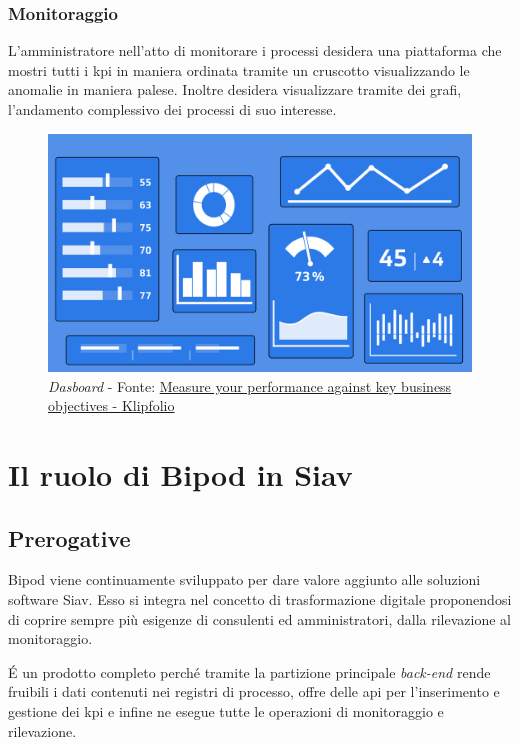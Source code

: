 \subsubsection{Monitoraggio}
L'amministratore nell'atto di monitorare i processi desidera una piattaforma che mostri tutti i \acrshort{kpi} in maniera ordinata tramite un cruscotto visualizzando le anomalie in maniera palese.  Inoltre desidera visualizzare tramite dei grafi, l'andamento complessivo dei processi di suo interesse.
\begin{figure}[H]
    \centering
    \includegraphics[width=0.80\columnwidth]{immagini/dashboard.png}
    \caption{\textit{Dasboard} - Fonte: \href{https://www.klipfolio.com/resources/articles/what-is-a-key-performance-indicator}{Measure your performance against key business objectives - Klipfolio}}
    \label{fig:my_label}
\end{figure}

\section{Il ruolo di Bipod in Siav}
\subsection{Prerogative}
Bipod viene continuamente sviluppato per dare valore aggiunto alle soluzioni software Siav. Esso si integra nel concetto di trasformazione digitale proponendosi di coprire sempre più esigenze di consulenti ed amministratori, dalla rilevazione al monitoraggio.

\'E un prodotto completo perché tramite la partizione principale \textit{back-end} rende fruibili i dati contenuti nei registri di processo, offre delle \acrshort{api} per l'inserimento e gestione dei \acrshort{kpi} e infine ne esegue tutte le operazioni di monitoraggio e rilevazione.

